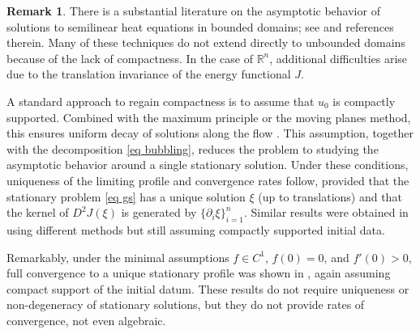 \documentclass[11pt,letterpaper,reqno]{amsart}
\newcommand{\R}{\mathbb{R}}
\theoremstyle{plain}%
\theoremstyle{definition}
\newtheorem{remark}[theorem]{Remark}
\numberwithin{equation}{section}
\numberwithin{figure}{section}
\begin{document}
\begin{remark}\label{remark compactly}
There is a substantial literature on the asymptotic behavior of solutions to semilinear heat equations in bounded domains; see \cite{busca2002convergence} and references therein. Many of these techniques do not extend directly to unbounded domains because of the lack of compactness. In the case of $\R^n$, additional difficulties arise due to the translation invariance of the energy functional $J$.

 A standard approach to regain compactness is to assume that $u_0$ is compactly supported. Combined with the maximum principle or the moving planes method, this ensures uniform decay of solutions along the flow \cite{feireisl1997long, cortazar1999uniqueness, busca2002convergence, feireisl1997threshold, foldes2011convergence}. This assumption, together with the decomposition \eqref{eq bubbling}, reduces the problem to studying the asymptotic behavior around a single stationary solution. Under these conditions, uniqueness of the limiting profile and convergence rates follow, provided that the stationary problem \eqref{eq gs} has a unique solution $\xi$ (up to translations) and that the kernel of $D^2J(\xi)$ is generated by $\{\partial_i \xi\}_{i=1}^n$. Similar results were obtained in \cite{cortazar1999uniqueness} using different methods but still assuming compactly supported initial data.
 
Remarkably, under the minimal assumptions $f \in C^1$, $f(0)=0$, and $f'(0)>0$, full convergence to a unique stationary profile was shown in \cite{busca2002convergence, foldes2011convergence}, again assuming compact support of the initial datum. These results do not require uniqueness or non-degeneracy of stationary solutions, but they do not provide rates of convergence, not even algebraic.
\end{remark}
\end{document}
